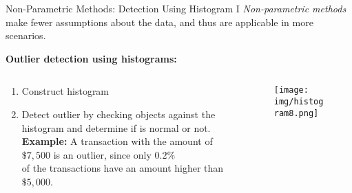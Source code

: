 \begin{frame}{Non-Parametric Methods: Detection Using Histogram I}
	\textit{Non-parametric methods} make fewer assumptions about the data, and thus are applicable in more scenarios.\\\bigskip

	\textbf{Outlier detection using histograms:}
	\begin{columns}
		\begin{column}{0.7\textwidth}
			\vspace*{-1em}
			\begin{enumerate}
				\item Construct histogram
				\item Detect outlier by checking objects against the histogram and determine if is normal or not.\\
				      \textbf{Example:} A transaction with the amount of $\$7,500$ is an outlier, since only $0.2\%$ \\ of the transactions have an amount higher than $\$5,000$.
			\end{enumerate}
		\end{column}
		\begin{column}{0.3\textwidth}
			\begin{figure}
				\centering
				\texttt{[image: img/histogram8.png]}
			\end{figure}
		\end{column}
	\end{columns}
\end{frame}


